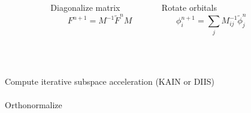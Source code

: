 \documentclass[mathserif, 8pt]{beamer}
\begin{document}
\begin{frame}
{\begin{columns}
    \begin{column}[b]{0.1\textwidth}
    \ \\
    \end{column}
    \begin{column}[b]{0.4\textwidth}
    \centering
    Diagonalize matrix
    \begin{equation}
	\nonumber
	F^{n+1} = M^{-1}\tilde{F}^nM
    \end{equation}
    \end{column}
    \begin{column}[b]{0.4\textwidth}
    \centering
    Rotate orbitals
    \begin{equation}
	\nonumber
	\phi_i^{n+1} = \sum_jM^{-1}_{ij}\tilde{\phi}_j^n
    \end{equation}
    \end{column}
    \begin{column}[b]{0.1\textwidth}
    \ \\
    \end{column}
    \end{columns}
    \ \\
    \ \\
    \pause
    Compute iterative subspace acceleration (KAIN or DIIS)\\
    \ \\
    Orthonormalize\\
    \ \\
    }
\end{frame}
\end{document}
